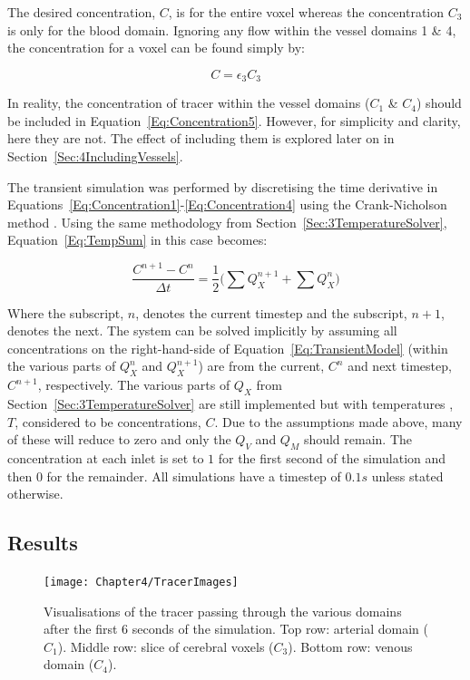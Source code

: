 \documentclass[11pt,english,a4paper,twoside,openright]{report}
\begin{document}
{{{{{{{{The desired concentration, $C$, is for the entire voxel whereas the concentration $C_{3}$ is only for the blood domain. Ignoring any flow within the vessel domains 1 \& 4, the concentration for a voxel can be found simply by:

\begin{equation}
\label{Eq:Concentration5}
C = \epsilon_{3}C_{3}
\end{equation} 

In reality, the concentration of tracer within the vessel domains ($C_{1}$ \& $C_{4}$) should be included in Equation~\ref{Eq:Concentration5}. However, for simplicity and clarity, here they are not. The effect of including them is explored later on in Section~\ref{Sec:4IncludingVessels}.

The transient simulation was performed by discretising the time derivative in Equations~\ref{Eq:Concentration1}-\ref{Eq:Concentration4} using the Crank-Nicholson method \cite{crank1947practical}. Using the same methodology from Section~\ref{Sec:3TemperatureSolver}, Equation~\ref{Eq:TempSum} in this case becomes:

\begin{equation}
\label{Eq:TransientModel}
\frac{C^{n+1}-C^{n}}{\Delta t} = \frac{1}{2}\bigg(\sum Q^{n+1}_{X} + \sum Q^{n}_{X}\bigg) 
\end{equation} 

Where the subscript, $n$, denotes the current timestep and the subscript, $n+1$, denotes the next. The system can be solved implicitly by assuming all concentrations on the right-hand-side of Equation~\ref{Eq:TransientModel} (within the various parts of $Q^{n}_{X}$ and $Q^{n+1}_{X}$) are from the current, $C^{n}$ and next timestep, $C^{n+1}$, respectively. The various parts of $Q_{X}$ from Section~\ref{Sec:3TemperatureSolver} are still implemented but with temperatures , $T$, considered to be concentrations, $C$. Due to the assumptions made above, many of these will reduce to zero and only the $Q_{V}$ and $Q_{M}$ should remain. The concentration at each inlet is set to $1$ for the first second of the simulation and then $0$ for the remainder. All simulations have a timestep of $0.1s$ unless stated otherwise. 

\subsection{Results}
\label{Sec:4ContinousTracerMethodResults}

\begin{figure}[h]
	\centering
	\texttt{[image: Chapter4/TracerImages]}
	\caption[Visualisations of the tracer passing through the various domains after the first 6 seconds of the simulation]{Visualisations of the tracer passing through the various domains after the first 6 seconds of the simulation. Top row: arterial domain ($C_{1}$). Middle row: slice of cerebral voxels ($C_{3}$). Bottom row: venous domain ($C_{4}$).}
	\label{fig:PerfusionTimeLapse}
\end{figure}

}}}}}}}}
\end{document}
